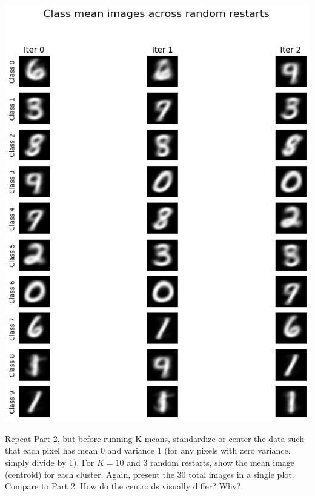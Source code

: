 \documentclass[expanded]{lkx_pset}
\begin{document}
\begin{parts}
	\begin{center}
		\includegraphics[scale=0.7]{figures/kmeans-class_means.png}
	\end{center}

	\pagebreak
	\begin{part}{3} Repeat Part 2, but before running K-means, standardize or center
		the data such that each pixel has mean 0 and variance 1 (for any
		pixels with zero variance, simply divide by 1). For $K=10$ and 3
		random restarts, show the mean image (centroid) for each
		cluster. Again, present the 30 total images in a single
		plot. Compare to Part 2: How do the centroids visually differ? Why?
	\end{part}


\end{parts}
\end{document}
